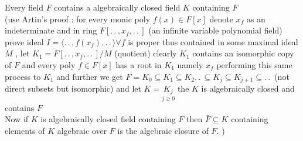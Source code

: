 \documentclass[11pt]{extarticle}
\newcommand{\ck}{.\,.\,}
\newcommand{\snote}[1]{{\footnotesize(#1)}}
\newcommand{\gen}[1]{\langle #1 \rangle}
\newcommand{\tbx}[2][]{
\begin{tcolorbox}[enhanced,breakable,size=small,colback=black!2!white,title={#1},arc is angular, arc=1.5mm,drop fuzzy shadow]
	#2
\end{tcolorbox}
}
\begin{document}
\begin{multicols}{2}
\tbx[Existence of Algebraic closure]{ Every field $ F $ contains a algebraically  closed field $ K $ containing $ F $ \\
\snote{use Artin's proof : for every monic poly $ f(x)\in  F[x]$ denote $ x_f $ as an indeterminate and in ring $ F[\ck,
x_f,\ck] $ (an infinite variable polynomial field) prove ideal $ I=\gen{\ck,f(x_f),\ck} \forall f$ is proper thus contained in some maximal ideal $ M $ , let $ K_1 =F[\ck , x_f,\ck ]/M$ (quotient) clearly $ K_1 $ contains an isomorphic copy of $ F $ and every poly $ f \in F[x]$ has a root  in $ K_1 $ namely $ x_f $ performing this same process to $ K_1 $ and further we get $ F=K_0\subseteq K_1 \subseteq K_2 \ck \subseteq K_j \subseteq K_{j+1} \subseteq\ck  $ (not direct subsets but isomorphic) and let $ K= \underset{j\geq 0}{K_j}$ the $ K $ is algebraically closed and contains $ F $ \\
Now if $ K $ is algebraically closed field containing $ F $ then $ \bar{F} \subseteq K$ containing elements of $ K $ algebraic over $ F$ is the algebraic closure of $ F.$  }}
\newcolumn


\end{multicols}
\end{document}
